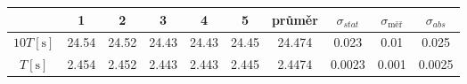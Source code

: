 \begin{tabular}{cccccccccc}                                                                                                                          \toprule
                        &   1       &   2       &   3       &   4       &   5       &   průměr  &   $\sigma_{stat}$ &   $\sigma_{\text{měř}}$   &   $\sigma_{abs}$  \\  \midrule
$10 T [\si{\second}]$   &   24.54   &   24.52   &   24.43   &   24.43   &   24.45   &   24.474  &   0.023           &   0.01                    &   0.025           \\    
$   T [\si{\second}]$   &   2.454   &   2.452   &   2.443   &   2.443   &   2.445   &   2.4474  &   0.0023          &   0.001                   &   0.0025          \\  \bottomrule  
\end{tabular}